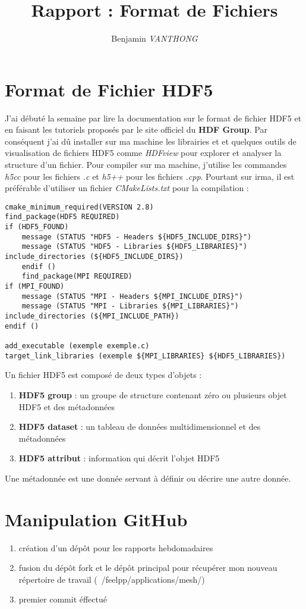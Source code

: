 \documentclass[12pt]{article}
\title {Rapport : Format de Fichiers}
\author {Benjamin \emph{VANTHONG}}
\begin{document}
\maketitle 
\section {Format de Fichier HDF5}
J'ai débuté la semaine par lire la documentation sur le format de fichier HDF5 et en faisant les tutoriels proposés par le site officiel du \textbf{HDF Group}. 
Par conséquent j'ai dû installer sur ma machine les librairies et et quelques outils de visualisation de fichiers HDF5 comme \emph{HDFview} pour explorer et analyser la structure d'un fichier.\newline
Pour compiler sur ma machine, j'utilise les commandes \emph{h5cc} pour les fichiers \emph{.c} et \emph{h5++} pour les fichiers \emph{.cpp}.\newline 
Pourtant sur irma, il est préférable d'utiliser un fichier \emph{CMakeLists.txt} pour la compilation :
\begin{lstlisting}
cmake_minimum_required(VERSION 2.8)
find_package(HDF5 REQUIRED)
if (HDF5_FOUND)
    message (STATUS "HDF5 - Headers ${HDF5_INCLUDE_DIRS}")
    message (STATUS "HDF5 - Libraries ${HDF5_LIBRARIES}")
include_directories (${HDF5_INCLUDE_DIRS})
    endif ()
    find_package(MPI REQUIRED)
if (MPI_FOUND)    
    message (STATUS "MPI - Headers ${MPI_INCLUDE_DIRS}")
    message (STATUS "MPI - Libraries ${MPI_LIBRARIES}")
include_directories (${MPI_INCLUDE_PATH})
endif ()

add_executable (exemple exemple.c)
target_link_libraries (exemple ${MPI_LIBRARIES} ${HDF5_LIBRARIES})
\end{lstlisting}
Un fichier HDF5 est composé de deux types d'objets :
\begin{enumerate}
\item \textbf{HDF5 group} : un groupe de structure contenant zéro ou plusieurs objet HDF5 et des métadonnées
\item \textbf{HDF5 dataset} : un tableau de données multidimensionnel et des métadonnées
\item \textbf{HDF5 attribut} : information qui décrit l'objet HDF5
\end{enumerate}
Une métadonnée est une donnée servant à définir ou décrire une autre donnée.
\section {Manipulation GitHub}
\begin{enumerate}
\item création d'un dépôt pour les rapports hebdomadaires
\item fusion du dépôt fork et le dépôt principal pour récupérer mon nouveau répertoire de travail (~/feelpp/applications/mesh/)
\item premier commit éffectué 
\end{enumerate}
\end{document}
